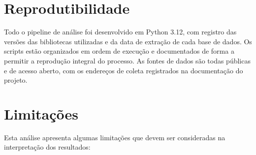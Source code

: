 

\section{Reprodutibilidade}

Todo o pipeline de análise foi desenvolvido em Python 3.12, com registro das versões das bibliotecas utilizadas e da data de extração de cada base de dados. Os scripts estão organizados em ordem de execução e documentados de forma a permitir a reprodução integral do processo. As fontes de dados são todas públicas e de acesso aberto, com os endereços de coleta registrados na documentação do projeto.

\section{Limitações}

Esta análise apresenta algumas limitações que devem ser consideradas na interpretação dos resultados:

